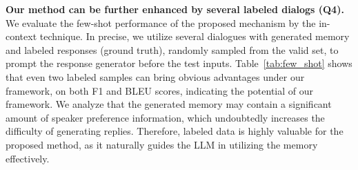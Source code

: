 \documentclass[authoryear,preprint,review,12pt]{elsarticle}
\begin{document}
\textbf{Our method can be further enhanced by several labeled dialogs (Q4).}
We evaluate the few-shot performance of the proposed mechanism by the in-context technique. In precise, we utilize several dialogues with generated memory and labeled responses (ground truth), randomly sampled from the valid set, to prompt the response generator before the test inputs.
Table~\ref{tab:few_shot} shows that even two labeled samples can bring obvious advantages under our framework, on both F1 and BLEU scores, indicating the potential of our framework. We analyze that the generated memory may contain a significant amount of speaker preference information, which undoubtedly increases the difficulty of generating replies. Therefore, labeled data is highly valuable for the proposed method, as it naturally guides the LLM in utilizing the memory effectively.
\begin{table}[t]
\centering
\caption{The comparative \textbf{results (\%) on zero-shot and few-shot when using generated memory} in MSC dataset.}
\label{tab:few_shot}
\end{table}
\end{document}

